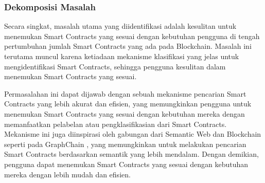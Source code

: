 \subsubsection{Dekomposisi Masalah}
\label{subsubsec:dekomposisi-masalah}


Secara singkat, masalah utama yang diidentifikasi adalah kesulitan untuk menemukan Smart Contracts yang sesuai dengan kebutuhan pengguna di tengah pertumbuhan jumlah Smart Contracts yang ada pada Blockchain. Masalah ini terutama muncul karena ketiadaan mekanisme klasifikasi yang jelas untuk mengidentifikasi Smart Contracts, sehingga pengguna kesulitan dalam menemukan Smart Contracts yang sesuai.

Permasalahan ini dapat dijawab dengan sebuah mekanisme pencarian Smart Contracts yang lebih akurat dan efisien, yang memungkinkan pengguna untuk menemukan Smart Contracts yang sesuai dengan kebutuhan mereka dengan memanfaatkan pelabelan atau pengklasifikasian dari Smart Contracts. Mekanisme ini juga diinspirasi oleh gabungan dari Semantic Web dan Blockchain seperti pada GraphChain \parencite{sopek2018graphchain}, yang memungkinkan untuk melakukan pencarian Smart Contracts berdasarkan semantik yang lebih mendalam. Dengan demikian, pengguna dapat menemukan Smart Contracts yang sesuai dengan kebutuhan mereka dengan lebih mudah dan efisien.

